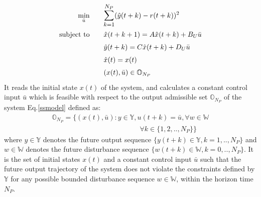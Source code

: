 \documentclass[letterpaper, 10 pt, conference]{ieeeconf}  %
\newcommand{\AB}[1]{\textbf{\color{magenta}{[AB: #1]}}}
\begin{document}
  	\begin{equation}
  	\small
  	\begin{aligned}
  	\underset{\bar{u}}{\text{min}}
  	&  \hspace{20pt} \mathlarger{\sum\limits_{k=1}^{N_P}}(\hat y(t+k)-r(t+k))^2 \\
  	\text{subject to}
  	& \hspace{20pt} \hat{x}(t+k+1) = A\hat{x}(t+k) + B_U\bar{u}\\
  	& \hspace{20pt} \hat y(t+k) = C\hat{x}(t+k) + D_U\bar{u} \\
  	& \hspace{20pt} \hat{x}(t)=x(t) \\
  	& \hspace{20pt} (x(t),\bar{u}) \in \mathbb{O}_{N_P}
  	\end{aligned}
  	\label{RMPC}
  	\end{equation}
  It reads the initial state $x(t)$ of the system, and calculates a constant control input $\bar{u}$ which is feasible with respect to the output admissible set $\mathbb{O}_{N_P}$ of the system Eq.\eqref{ssmodel} defined as:
  \begin{equation}
  \begin{matrix}
  \mathbb{O}_{N_P} = \{(x(t),\bar{u}):y\in \mathbb{Y}, u(t+k)=\bar{u},\forall w \in \mathbb{W}  \\ \hspace{150pt} \forall k \in \{1,2,..,N_P\} \}
  \end{matrix}
  \label{O_form}
  \end{equation}
  where $y \in \mathbb{Y}$ denotes the future output sequence $\{y(t+k)\in\mathbb{Y},k=1,..,N_P\}$
  and $w \in \mathbb{W}$ denotes the future disturbance sequence $\{w(t+k)\in\mathbb{W},k=0,..,N_P\}$.
  It is the set of initial states $x(t)$ and a constant control input $\bar{u}$ such that the future output trajectory of the system does not violate the constraints defined by $\mathbb{Y}$ for any possible bounded disturbance sequence $w\in\mathbb{W}$, within the horizon time $N_P$. 
\end{document}
